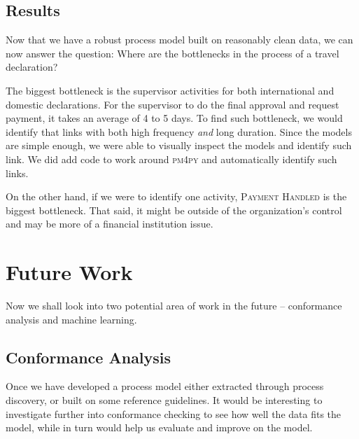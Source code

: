\documentclass[conference]{IEEEtran}
\begin{document}
\subsection{Results}

Now that we have a robust process model built on reasonably clean data,
we can now answer the question: 
Where are the bottlenecks in the process of a travel declaration?

The biggest bottleneck is the supervisor activities for both international
and domestic declarations.  For the supervisor to do the final approval and
request payment, it takes an average of 4 to 5 days.
To find such bottleneck, we would identify that
links with both high frequency \textit{and} long duration. Since the models
are simple enough, we were able to visually inspect the models and identify
such link. We did add code to work around \textsc{pm4py} and
automatically identify such links.

On the other hand, if we
were to identify one activity, \textsc{Payment Handled}
is the biggest bottleneck. That said,
it might be outside of the organization’s control and may be more of a
financial institution issue.


\section{Future Work}
\label{section-future}

Now we shall look into two potential area of work in the future --
conformance analysis and machine learning.

\subsection{Conformance Analysis}

Once we have developed a process model either extracted through process
discovery, or built on some reference guidelines. It would be
interesting to investigate further into conformance checking to see how
well the data fits the model, while in turn would help us evaluate and
improve on the model.
\end{document}
